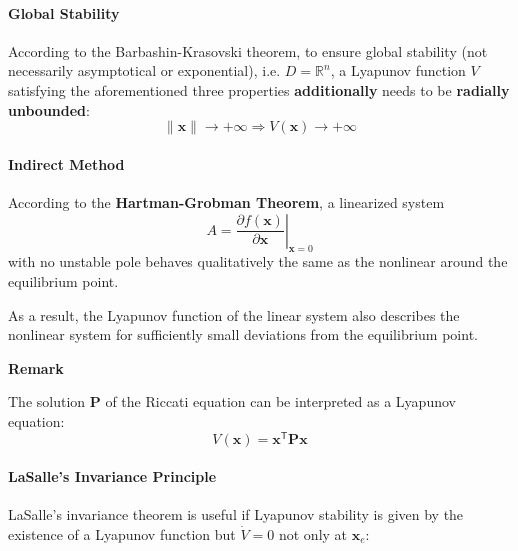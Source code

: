 \paragraph{Global Stability}
According to the Barbashin-Krasovski theorem, to ensure global stability (not necessarily asymptotical or exponential), i.e. $D=\mathbb{R}^n$, a Lyapunov function $V$ satisfying the aforementioned three properties \textbf{additionally} needs to be \textbf{radially unbounded}:
\noindent\begin{equation*}
    \|\mathbf{x}\| \to +\infty \Rightarrow V(\mathbf{x}) \to +\infty
\end{equation*}

\paragraph{Indirect Method}
According to the \textbf{Hartman-Grobman Theorem}, a linearized system
\noindent\begin{equation*}
    A = \left.\frac{\partial f(\mathbf{x})}{\partial \mathbf{x}} \right|_{\mathbf{x} = 0}
\end{equation*} with no unstable pole behaves qualitatively the same as the nonlinear around the equilibrium point.

\newpar{}
As a result, the Lyapunov function of the linear system also describes the nonlinear system for sufficiently small deviations from the equilibrium point.

\newpar{}
\textbf{Remark}

The solution $\mathbf{P}$ of the Riccati equation can be interpreted as a Lyapunov equation:
\noindent\begin{equation*}
    V(\mathbf{x}) = \mathbf{x}^{\mathsf{T}} \mathbf{Px}
\end{equation*}

\paragraph{LaSalle's Invariance Principle}
LaSalle's invariance theorem is useful if Lyapunov stability is given by the existence of a Lyapunov function but $\dot{V}=0$ not only at $\mathbf{x}_e$:

